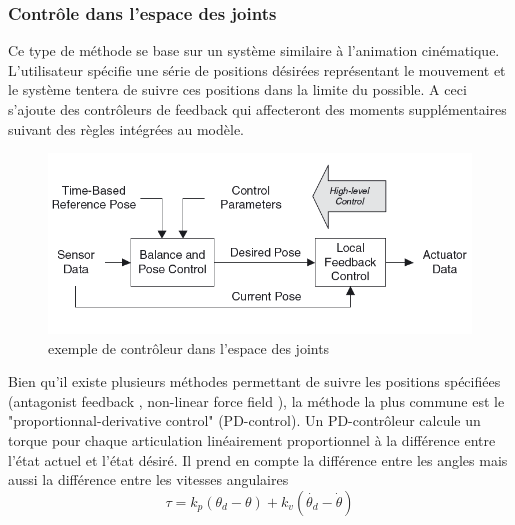 \documentclass{llncs}
\begin{document}
\subsubsection{Contrôle dans l'espace des joints} 
Ce type de méthode se base sur un système similaire à l'animation cinématique. L'utilisateur spécifie une série de positions désirées représentant le mouvement et le système tentera de suivre ces positions dans la limite du possible. A ceci s'ajoute des contrôleurs de feedback qui affecteront des moments supplémentaires suivant des règles intégrées au modèle.
\begin{figure}[h]
\centering
\includegraphics[scale=0.5]{joint_space_motion_control.png}
\caption{exemple de contrôleur dans l'espace des joints \cite{geijtenbeek2012interactive}}
\label{fig:joint_space_motion_control}
\end{figure}



Bien qu'il existe plusieurs méthodes permettant de suivre les positions spécifiées (antagonist feedback \cite{neff2002modeling}, non-linear force field \cite{mussa1997nonlinear}), la méthode la plus commune est le "proportionnal-derivative control" (PD-control). Un PD-contrôleur calcule un torque pour chaque articulation linéairement proportionnel à la différence entre l'état actuel et l'état désiré. Il prend en compte la différence entre les angles mais aussi la différence entre les vitesses angulaires 
\[
\tau=k_p(\theta_d - \theta) + k_v(\dot{\theta_d} - \dot{\theta})
\]
\end{document}
